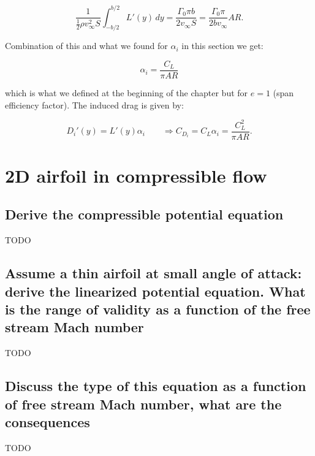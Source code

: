 \documentclass[british,french,11pt, a4paper, openany]{article}
\begin{document}
\begin{equation}
\frac{1}{\frac{1}{2}\rho v_\infty ^2 S} \int _{-b/2}^{b/2} L'(y) \, dy = \frac{\Gamma _0\pi b}{2v_\infty S} = \frac{\Gamma _0 \pi}{2bv_\infty} AR.
\end{equation}

Combination of this and what we found for $\alpha _i$ in this section we get:

\begin{equation}
\alpha _i = \frac{C_L}{\pi AR}
\end{equation}

which is what we defined at the beginning of the chapter but for $e =1$ (span efficiency factor). The induced drag is given by:

\begin{equation}
D_i'(y) = L'(y) \alpha _i \qquad \Rightarrow C_{D_i} = C_L \alpha _i = \frac{C_L^2}{\pi AR}.
\end{equation}



\section{2D airfoil in compressible flow}
\subsection{Derive the compressible potential equation}
TODO

\subsection{Assume a thin airfoil at small angle of attack: derive the linearized potential equation. What is the range of validity as a function of the free stream Mach number}
TODO

\subsection{Discuss the type of this equation as a function of free stream Mach number,	what are the consequences}
TODO

\end{document}
